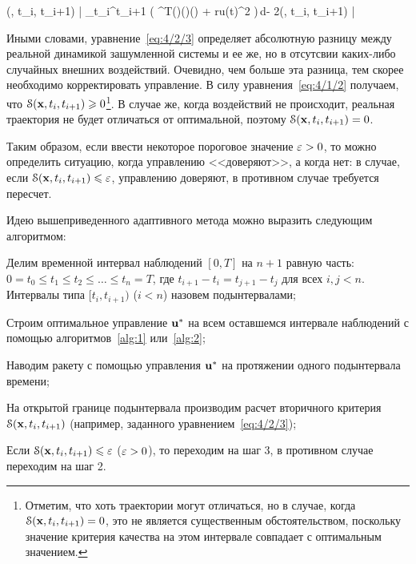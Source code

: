 	\funcS(, t_i, t_{i+1}) \eqdef \Biggl| \int\limits_{t_i}^{t_{i+1}} \bigl( ^T(\tau)(\tau)(\tau) + ru(t)^2 \bigr)\,d\tau - 2\optF(, t_i, t_{i+1}) \Biggr| 
\eeq

Иными словами, уравнение~\ref{eq:4/2/3} определяет абсолютную разницу между реальной динамикой зашумленной системы и ее же, но в отсутсвии каких-либо случайных внешних воздействий. Очевидно, чем больше эта разница, тем скорее необходимо корректировать управление. В силу уравнения~\vref{eq:4/1/2} получаем, что $\mathcal{S}(\mathbf{x}, t_i, t_{i+1}) \geqslant 0$\footnote{Отметим, что хоть траектории могут отличаться, но в случае, когда $\mathcal{S}(\mathbf{x}, t_i, t_{i+1}) = 0$, это не является существенным обстоятельством, поскольку значение критерия качества на этом интервале совпадает с оптимальным значением.}. В случае же, когда воздействий не происходит, реальная траектория не будет отличаться от оптимальной, поэтому $\mathcal{S}(\mathbf{x}, t_i, t_{i+1}) = 0$.

Таким образом, если ввести некоторое пороговое значение $\varepsilon > 0$, то можно определить ситуацию, когда управлению <<доверяют>>, а когда нет: в случае, если $\mathcal{S}(\mathbf{x}, t_i, t_{i+1}) \leqslant \varepsilon$, управлению доверяют, в противном случае требуется пересчет.

Идею вышеприведенного адаптивного метода можно выразить следующим алгоритмом:

	\benum
		\item
			Делим временной интервал наблюдений $[0, T]$ на $n+1$ равную часть: $0 = t_0 \leqslant t_1 \leqslant t_2 \leqslant \ldots \leqslant t_{n} = T$, где $t_{i+1}-t_i = t_{j+1}-t_j$ для всех $i, j < n$. Интервалы типа $[t_i, t_{i+1})$ ($i<n$) назовем подынтервалами;
		
		\item
			Строим оптимальное управление $\mathbf{u}^{*}$ на всем оставшемся интервале наблюдений с помощью алгоритмов~\ref{alg:1} или~\vref{alg:2};
		
		\item
			Наводим ракету с помощью управления $\mathbf{u}^{*}$ на протяжении одного подынтервала времени;
		
		\item
			На открытой границе подынтервала производим расчет вторичного критерия $\mathcal{S}(\mathbf{x}, t_i, t_{i+1})$ (например, заданного уравнением~\ref{eq:4/2/3});
			
		\item
			Если $\mathcal{S}(\mathbf{x}, t_i, t_{i+1}) \leqslant \varepsilon$ ($\varepsilon > 0$), то переходим на шаг 3, в противном случае переходим на шаг 2.

